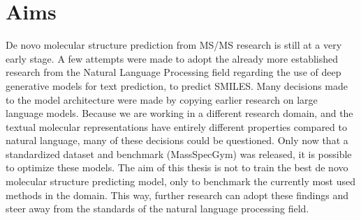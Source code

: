 \chapter{Aims}
\label{chap:aims}

De novo molecular structure prediction from \ac{MS/MS} research is still at a very early stage.
A few attempts were made to adopt the already more established research from the Natural Language Processing field regarding the use of deep generative models for text prediction, to predict SMILES.
Many decisions made to the model architecture were made by copying earlier research on large language models.
Because we are working in a different research domain, and the textual molecular representations have entirely different properties compared to natural language,
many of these decisions could be questioned.
Only now that a standardized dataset and benchmark (MassSpecGym) was released, it is possible to optimize these models.
The aim of this thesis is not to train the best de novo molecular structure predicting model,
only to benchmark the currently most used methods in the domain.
This way, further research can adopt these findings and steer away from the standards of the natural language processing field.

